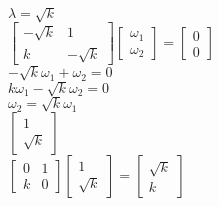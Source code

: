 \\
$\lambda=\sqrt{k}$\\
$\left[\begin{array}{cc}-\sqrt{k}&1\\k&-\sqrt{k}\end{array}\right]\left[\begin{array}{c}\omega_1\\\omega_2\end{array}\right]=\left[\begin{array}{c}0\\0\end{array}\right]$\\
$-\sqrt{k}\omega_1+\omega_2=0$\\
$k\omega_1-\sqrt{k}\omega_2=0$\\
$\omega_2=\sqrt{k}\omega_1$\\
$\left[\begin{array}{c}1\\\sqrt{k}\end{array}\right]$\\
$\left[\begin{array}{cc}0&1\\k&0\end{array}\right]\left[\begin{array}{c}1\\\sqrt{k}\end{array}\right]=\left[\begin{array}{c}\sqrt{k}\\k\end{array}\right]$\\

